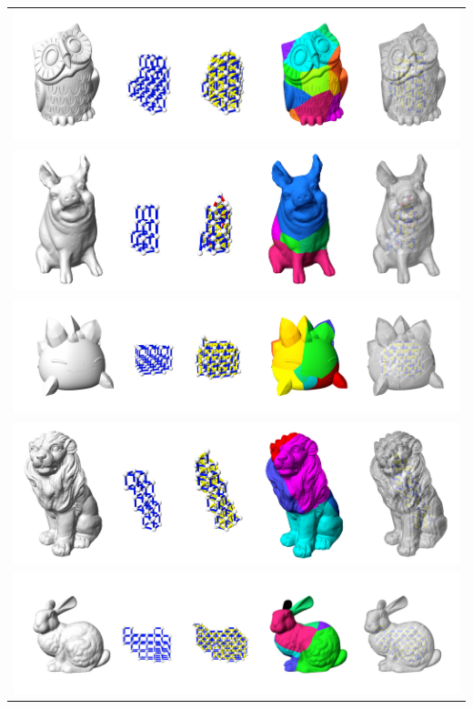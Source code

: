 \begin{table}[ht]
\centering
\resizebox{1.\linewidth}{!} {
\begin{tabular}{c} 
\includegraphics{figs/owl.pdf}\\
\includegraphics{figs/pig.pdf} \\
\includegraphics{figs/slime_high.pdf}\\
\includegraphics{figs/lion.pdf}\\
\includegraphics{figs/bunny_150.pdf}\\
\end{tabular}
}
\caption{}
\label{tab:result_ZomeFab_file_2}
\end{table}

